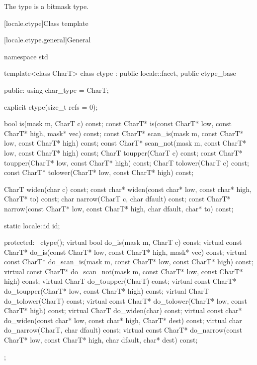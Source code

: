\pnum
The type  is a bitmask type.

[locale.ctype]{Class template }

[locale.ctype.general]{General}

%
\begin{codeblock}
namespace std {
  template<class CharT>
    class ctype : public locale::facet, public ctype_base {
    public:
      using char_type = CharT;

      explicit ctype(size_t refs = 0);

      bool         is(mask m, CharT c) const;
      const CharT* is(const CharT* low, const CharT* high, mask* vec) const;
      const CharT* scan_is(mask m, const CharT* low, const CharT* high) const;
      const CharT* scan_not(mask m, const CharT* low, const CharT* high) const;
      CharT        toupper(CharT c) const;
      const CharT* toupper(CharT* low, const CharT* high) const;
      CharT        tolower(CharT c) const;
      const CharT* tolower(CharT* low, const CharT* high) const;

      CharT        widen(char c) const;
      const char*  widen(const char* low, const char* high, CharT* to) const;
      char         narrow(CharT c, char dfault) const;
      const CharT* narrow(const CharT* low, const CharT* high, char dfault, char* to) const;

      static locale::id id;

    protected:
      ~ctype();
      virtual bool         do_is(mask m, CharT c) const;
      virtual const CharT* do_is(const CharT* low, const CharT* high, mask* vec) const;
      virtual const CharT* do_scan_is(mask m, const CharT* low, const CharT* high) const;
      virtual const CharT* do_scan_not(mask m, const CharT* low, const CharT* high) const;
      virtual CharT        do_toupper(CharT) const;
      virtual const CharT* do_toupper(CharT* low, const CharT* high) const;
      virtual CharT        do_tolower(CharT) const;
      virtual const CharT* do_tolower(CharT* low, const CharT* high) const;
      virtual CharT        do_widen(char) const;
      virtual const char*  do_widen(const char* low, const char* high, CharT* dest) const;
      virtual char         do_narrow(CharT, char dfault) const;
      virtual const CharT* do_narrow(const CharT* low, const CharT* high,
                                     char dfault, char* dest) const;
    };
}
\end{codeblock}

